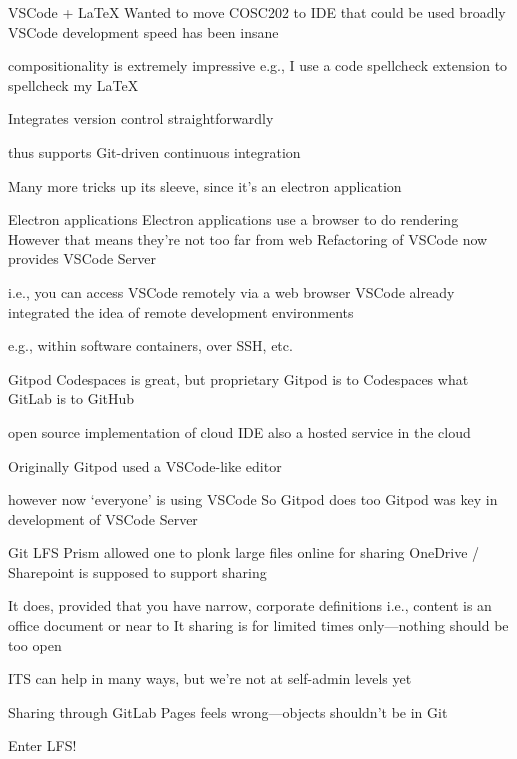 \documentclass[aspectratio=169,t]{beamer}
\begin{document}

\begin{dframe}{VSCode + \LaTeX}
  \1 Wanted to move COSC202 to IDE that could be used broadly
  \1 VSCode development speed has been insane
  
  \2 compositionality is extremely impressive
  \2 e.g., I use a code spellcheck extension to spellcheck my \LaTeX{}

  \1 Integrates version control straightforwardly
  
  \2 thus supports Git-driven continuous integration
  
  \1 Many more tricks up its sleeve, since it's an electron application
\end{dframe}

\begin{dframe}{Electron applications}
  \1 Electron applications use a browser to do rendering
  \1 However that means they're not too far from web
  \1 Refactoring of VSCode now provides VSCode Server
  
  \2 i.e., you can access VSCode remotely via a web browser
  \2 VSCode already integrated the idea of remote development environments

  \3 e.g., within software containers, over SSH, etc.
\end{dframe}

\begin{dframe}{Gitpod}
  \1 Codespaces is great, but proprietary
  \1 Gitpod is to Codespaces what GitLab is to GitHub
  
  \2 open source implementation of cloud IDE
  \2 also a hosted service in the cloud

  \1 Originally Gitpod used a VSCode-like editor

  \2 however now `everyone' is using VSCode
  \2 So Gitpod does too
  \2 Gitpod was key in development of VSCode Server
\end{dframe}

\begin{dframe}{Git LFS}
  \1 Prism allowed one to plonk large files online for sharing
  \1 OneDrive / Sharepoint is supposed to support sharing

  \2 It does, provided that you have narrow, corporate definitions
  \2 i.e., content is an office document or near to It
  \2 sharing is for limited times only---nothing should be too open

  \1 ITS can help in many ways, but we're not at self-admin levels yet

  \1 Sharing through GitLab Pages feels wrong---objects shouldn't be in Git
  
  \1 Enter LFS!

\end{dframe}
\end{document}
